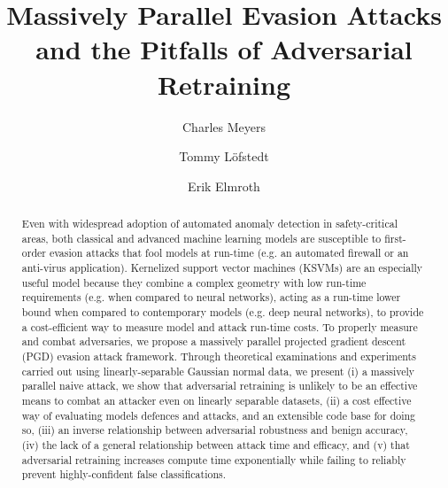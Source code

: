\documentclass[runningheads]{llncs}
\begin{document}

\author{Charles Meyers \and
Tommy L\"{o}fstedt  \and
Erik Elmroth }



\title{Massively Parallel Evasion Attacks and the Pitfalls of Adversarial Retraining}
\maketitle              %
%

\begin{abstract}
Even with widespread adoption of automated anomaly detection in safety-critical areas, both classical and advanced machine learning models are susceptible to first-order evasion attacks that fool models at run-time (e.g. an automated firewall or an anti-virus application). Kernelized support vector machines (KSVMs) are an especially useful model because they combine a complex geometry with low run-time requirements (e.g. when compared to neural networks), acting as a run-time lower bound when compared to contemporary models (e.g. deep neural networks), to provide a cost-efficient way to measure model and attack run-time costs. To properly measure and combat adversaries, we propose a massively parallel projected gradient descent (PGD) evasion attack framework. Through theoretical examinations and experiments carried out using linearly-separable Gaussian normal data, we present (i) a massively parallel naive attack, we show that adversarial retraining is unlikely to be an effective means to combat an attacker even on linearly separable datasets, (ii) a cost effective way of evaluating models defences and attacks, and an extensible code base for doing so, (iii) an inverse relationship between adversarial robustness and benign accuracy, (iv) the lack of a general relationship between attack time and efficacy, and (v) that adversarial retraining increases compute time exponentially while failing to reliably prevent highly-confident false classifications.
\end{abstract}
\end{document}
